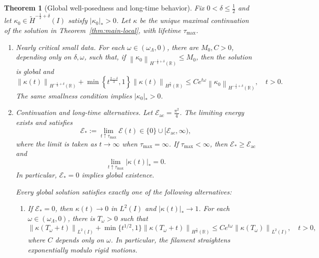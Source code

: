 \documentclass[11pt,reqno]{amsart}
\theoremstyle{plain}
\newtheorem{theorem}{Theorem}[section]
\theoremstyle{definition}
\numberwithin{equation}{section}
\newcommand{\mc}[1]{\mathcal{#1}}
\newcommand{\wt}[1]{\widetilde{#1}}
\newcommand{\abs}[1]{\left\lvert #1 \right\rvert}
\newcommand{\norm}[1]{\left\lVert #1 \right\rVert}
\newcommand{\R}{\mathbb{R}}
\newcommand{\thi}[1]{\wt H^{#1}(I)}
\newcommand{\hr}[1]{H^{#1}(\R)}
\begin{document}
\begin{theorem}[Global well-posedness and long-time behavior]
\label{thm:main-global}
Fix $0<\delta\le\frac12$ and let
$\kappa_0\in\thi{-\frac12+\delta}$ satisfy $\abs{\kappa_0}_*>0$.
Let $\kappa$ be the unique maximal continuation of the solution in
Theorem~\ref{thm:main-local}, with lifetime $\tau_{\mathrm{max}}$.
\begin{enumerate}
    \item \emph{Nearly critical small data.}
    For each $\omega\in(\omega_\Lambda,0)$, there are $M_0,C>0$, depending
    only on $\delta,\omega$, such that, if
    $\norm{\kappa_0}_{\hr{-\frac12+\delta}}\le M_0$, then the solution
    is global and
    \begin{equation}\label{eqn:main-global-decay}
        \norm{\kappa(t)}_{\hr{-\frac12+\delta}} +\min\left\{t^{\frac{2-\delta}{3}},1\right\}
        \norm{\kappa(t)}_{\hr{\frac32}} \le Ce^{t\omega} \norm{\kappa_0}_{\hr{-\frac12+\delta}}, \quad t>0.
    \end{equation}
    The same smallness condition implies $\abs{\kappa_0}_*>0$.

    \item \emph{Continuation and long-time alternatives.}
    Let $\mc E_{\mathrm{ac}}=\frac{\pi^2}{4}$. The limiting energy exists and satisfies
    \begin{equation}\label{eqn:main-energy-gap}
        \mc E_*:=\lim_{t\uparrow\tau_{\mathrm{max}}}\mc E(t)
        \in\{0\}\cup[\mc E_{\mathrm{ac}},\infty),
    \end{equation}
    where the limit is taken as $t\to\infty$ when
    $\tau_{\mathrm{max}}=\infty$.
    If $\tau_{\mathrm{max}}<\infty$, then
    $\mc E_*\ge\mc E_{\mathrm{ac}}$ and
    \begin{equation*}
        \lim_{t\uparrow\tau_{\mathrm{max}}}\abs{\kappa(t)}_*=0.
    \end{equation*}
    In particular, $\mc E_*=0$ implies global existence.

    Every global solution satisfies exactly one of the following alternatives:
    \begin{enumerate}
        \item If $\mc E_*=0$, then $\kappa(t)\to0$ in $L^2(I)$ and
        $\abs{\kappa(t)}_*\to1$. For each
        $\omega\in(\omega_\Lambda,0)$, there is $T_\omega>0$ such that
        \begin{equation*}
            \norm{\kappa(T_\omega+t)}_{L^2(I)}
            +\min\{t^{1/2},1\}
            \norm{\kappa(T_\omega+t)}_{\hr{\frac32}}
            \le Ce^{t\omega}\norm{\kappa(T_\omega)}_{L^2(I)},
            \quad t>0,
        \end{equation*}
        where $C$ depends only on $\omega$. In particular, the filament
        straightens exponentially modulo rigid motions.


\end{enumerate}
\end{enumerate}
\end{theorem}
\end{document}
